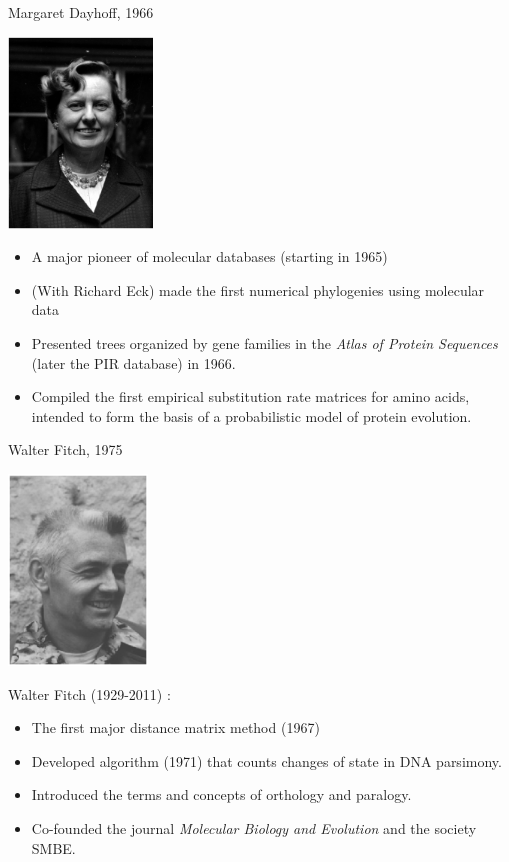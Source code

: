 \documentclass[bluish,slideColor,colorBG,pdf]{prosper}
\begin{document}
\begin{slide}[Replace]{Margaret Dayhoff, 1966}

\begin{center}
\includegraphics[height=2.0in]{dayhoff2.ps}
\end{center}

{
\begin{itemize}
\setlength{\itemsep}{2pt}
\item A major pioneer of molecular databases (starting in 1965)
\item (With Richard Eck) made the first numerical phylogenies using molecular
data
\item Presented trees organized by gene families in the {\it Atlas of Protein
Sequences} (later the PIR database) in 1966.
\item Compiled the first empirical substitution rate matrices for amino acids,
intended to form the basis of a probabilistic model of protein evolution.
\end{itemize}
}

\end{slide}
\begin{slide}[Replace]{Walter Fitch, 1975}

\begin{center}
\includegraphics[height=2.0in]{Fitch3.ps}
\end{center}

Walter Fitch (1929-2011) :

{ 
\begin{itemize}
\item The first major distance matrix method (1967) 
\item Developed algorithm (1971) that counts changes of state in DNA parsimony.
\item Introduced the terms and concepts of orthology and paralogy.
\item Co-founded the journal {\it Molecular Biology and Evolution} and the society SMBE.
\end{itemize}
}

\end{slide}
\end{document}
